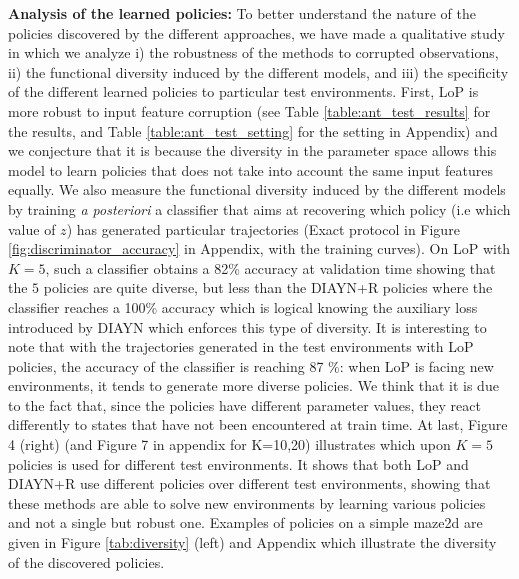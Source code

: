 \textbf{Analysis of the learned policies: } To better understand the nature of the policies discovered by the different approaches, we have made a qualitative study in which we analyze i) the robustness of the methods to corrupted observations, ii) the functional diversity induced by the different models, and iii) the specificity of the different learned policies to particular test environments. First, LoP is more robust to input feature corruption (see Table \ref{table:ant_test_results} for the results, and Table \ref{table:ant_test_setting} for the setting in Appendix) and we conjecture that it is because the diversity in the parameter space allows this model to learn policies that does not take into account the same input features equally. We also measure the functional diversity induced by the different models by training \textit{a posteriori} a classifier that aims at recovering which policy (i.e which value of $z$) has generated particular trajectories (Exact protocol in Figure \ref{fig:discriminator_accuracy} in Appendix, with the training curves). On LoP with $K=5$, such a classifier obtains a 82\% accuracy at validation time showing that the $5$ policies are quite diverse, but less than the DIAYN+R policies where the classifier reaches a 100\% accuracy which is logical knowing the auxiliary loss introduced by DIAYN which enforces this type of diversity. It is interesting to note that with the trajectories generated in the test environments with LoP policies, the accuracy of the classifier is reaching 87 \%: when LoP is facing new environments, it tends to generate more diverse policies. We think that it is due to the fact that, since the policies have different parameter values, they react differently to states that have not been encountered at train time.  At last, Figure 4 (right) (and Figure 7 in appendix for K=10,20) illustrates which upon $K=5$ policies is used for different test environments. It shows that both LoP and DIAYN+R use different policies over different test environments, showing that these methods are able to solve new environments by learning various policies and not a single but robust one. Examples of policies on a simple maze2d are given in Figure \ref{tab:diversity} (left) and Appendix which illustrate the diversity of the discovered policies.


